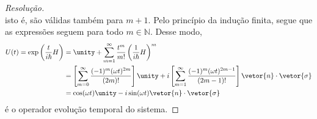 \begin{proof}[Resolução]
\begin{equation*}
   \end{equation*}
   isto é, são válidas também para \(m + 1.\) Pelo princípio da indução finita, segue que as expressões seguem para todo \(m \in \mathbb{N}.\) Desse modo,
   \begin{align*}
      U(t) = \exp\left(\frac{t}{i\hbar}H\right) &= \unity + \sum_{m = 1}^\infty \frac{t^m}{m!}\left(\frac{1}{i \hbar} H\right)^{m}\\
                                                &= \left[\sum_{m = 0}^\infty \frac{(-1)^m (\omega t)^{2m}}{(2m)!}\right]\unity + i\left[\sum_{m = 1}^\infty \frac{(-1)^m(\omega t)^{2m - 1}}{(2m-1)!}\right]\vetor{n}\cdot \vetor{\sigma}\\
                                                &= \cos(\omega t) \unity - i \sin(\omega t) \vetor{n} \cdot \vetor{\sigma}
   \end{align*}
   é o operador evolução temporal do sistema.
\end{proof}
